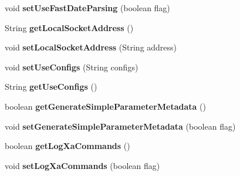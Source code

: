 \begin{DoxyCompactItemize}
void {\bfseries set\+Use\+Fast\+Date\+Parsing} (boolean flag)
\item 
\mbox{\label{interfacecom_1_1mysql_1_1jdbc_1_1_connection_properties_afa591a9ef3a480484546ff5fa43e5b83}} 
String {\bfseries get\+Local\+Socket\+Address} ()
\item 
\mbox{\label{interfacecom_1_1mysql_1_1jdbc_1_1_connection_properties_a106adf942bd49a8c182f4b2165a43e21}} 
void {\bfseries set\+Local\+Socket\+Address} (String address)
\item 
\mbox{\label{interfacecom_1_1mysql_1_1jdbc_1_1_connection_properties_a9b667482be75442bc3b15a596d6db35b}} 
void {\bfseries set\+Use\+Configs} (String configs)
\item 
\mbox{\label{interfacecom_1_1mysql_1_1jdbc_1_1_connection_properties_a3fa8972605cebdbee94e24a1faa8e6b3}} 
String {\bfseries get\+Use\+Configs} ()
\item 
\mbox{\label{interfacecom_1_1mysql_1_1jdbc_1_1_connection_properties_a262a4dc82c148e7fd29552403e7bfd2e}} 
boolean {\bfseries get\+Generate\+Simple\+Parameter\+Metadata} ()
\item 
\mbox{\label{interfacecom_1_1mysql_1_1jdbc_1_1_connection_properties_aaed84cf5a71f23633353a2fb46d677b6}} 
void {\bfseries set\+Generate\+Simple\+Parameter\+Metadata} (boolean flag)
\item 
\mbox{\label{interfacecom_1_1mysql_1_1jdbc_1_1_connection_properties_a515cbe4d959bb26957253700d9b0d440}} 
boolean {\bfseries get\+Log\+Xa\+Commands} ()
\item 
\mbox{\label{interfacecom_1_1mysql_1_1jdbc_1_1_connection_properties_a4603e72447929b7d60ccdb1214867e83}} 
void {\bfseries set\+Log\+Xa\+Commands} (boolean flag)
\item 

\end{DoxyCompactItemize}
